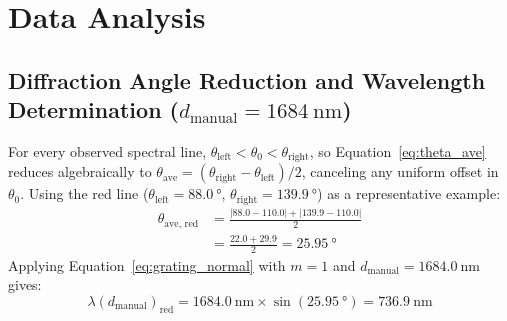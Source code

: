 \documentclass[journal]{IEEEtran}
\begin{document}
\section{Data Analysis}

\subsection{Diffraction Angle Reduction and Wavelength Determination (\texorpdfstring{$d_{\text{manual}} = \SI{1684}{\nano\meter}$}{d\_manual = 1684 nm})}
For every observed spectral line, $\theta_{\text{left}} < \theta_0 < \theta_{\text{right}}$, so Equation~\eqref{eq:theta_ave} reduces algebraically to $\theta_{\text{ave}} = (\theta_{\text{right}} - \theta_{\text{left}})/2$, canceling any uniform offset in $\theta_0$. Using the red line ($\theta_{\text{left}} = \SI{88.0}{\degree}$, $\theta_{\text{right}} = \SI{139.9}{\degree}$) as a representative example:
\begin{equation}
\begin{aligned}
    \theta_{\text{ave, red}} &= \frac{|88.0 - 110.0| + |139.9 - 110.0|}{2} \\
    &= \frac{22.0 + 29.9}{2} = \SI{25.95}{\degree}
\end{aligned}
    \label{eq:example_theta_ave}
\end{equation}
Applying Equation~\eqref{eq:grating_normal} with $m = 1$ and $d_{\text{manual}} = \SI{1684.0}{\nano\meter}$ gives:
\begin{equation}
    \lambda(d_{\text{manual}})_{\text{red}} = \SI{1684.0}{\nano\meter} \times \sin(\SI{25.95}{\degree}) = \SI{736.9}{\nano\meter}
    \label{eq:example_lambda}
\end{equation}
\end{document}

